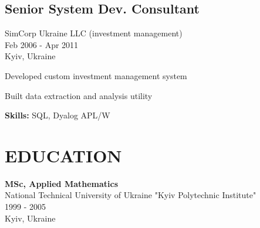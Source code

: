 \documentclass[a4paper,10pt]{article}
\begin{document}
\subsection*{Senior System Dev. Consultant}
SimCorp Ukraine LLC (investment management) \\
Feb 2006 - Apr 2011 \\
Kyiv, Ukraine
\begin{bulletlist}
    \item Developed custom investment management system
    \item Built data extraction and analysis utility
\end{bulletlist}
\textbf{Skills:} SQL, Dyalog APL/W

\section*{EDUCATION}
\textbf{MSc, Applied Mathematics} \\
National Technical University of Ukraine "Kyiv Polytechnic Institute" \\
1999 - 2005 \\
Kyiv, Ukraine
\end{document}

